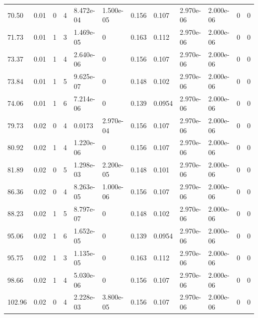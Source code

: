 \documentclass[preview]{standalone}
\begin{document}
{{\begin{tabular}{L{1.2cm}C{1.2cm} C{0.3cm}C{0.5cm} C{1.4cm}C{1.4cm} C{1.4cm}C{1.4cm} C{1.6cm}C{1.6cm} C{1.6cm}C{1.6cm}}
  70.50  &  0.01  & 0     &  4 &  8.472e-04  & 1.500e-05  &  0.156&   0.107& 2.970e-06 & 2.000e-06   &  0 & 0  \\ 
  71.73  &  0.01  & 1     &  3 &  1.469e-05  & 0  &  0.163&   0.112& 2.970e-06 & 2.000e-06   &  0 & 0  \\ 
  73.37  &  0.01  & 1     &  4 &  2.640e-06  & 0  &  0.156&   0.107& 2.970e-06 & 2.000e-06   &  0 & 0  \\ 
  73.84  &  0.01  & 1     &  5 &  9.625e-07  & 0  &  0.148&   0.102& 2.970e-06 & 2.000e-06   &  0 & 0  \\ 
  74.06  &  0.01  & 1     &  6 &  7.214e-06  & 0  &  0.139&   0.0954& 2.970e-06 & 2.000e-06   &  0 & 0  \\ 
  79.73  &  0.02  & 0     &  4 &  0.0173  & 2.970e-04  &  0.156&   0.107& 2.970e-06 & 2.000e-06   &  0 & 0  \\ 
  80.92  &  0.02  & 1     &  4 &  1.220e-06  & 0  &  0.156&   0.107& 2.970e-06 & 2.000e-06   &  0 & 0  \\ 
  81.89  &  0.02  & 0     &  5 &  1.298e-03  & 2.200e-05  &  0.148&   0.101& 2.970e-06 & 2.000e-06   &  0 & 0  \\ 
  86.36  &  0.02  & 0     &  4 &  8.263e-05  & 1.000e-06  &  0.156&   0.107& 2.970e-06 & 2.000e-06   &  0 & 0  \\ 
  88.23  &  0.02  & 1     &  5 &  8.797e-07  & 0  &  0.148&   0.102& 2.970e-06 & 2.000e-06   &  0 & 0  \\ 
  95.06  &  0.02  & 1     &  6 &  1.652e-05  & 0  &  0.139&   0.0954& 2.970e-06 & 2.000e-06   &  0 & 0  \\ 
  95.75  &  0.02  & 1     &  3 &  1.135e-05  & 0  &  0.163&   0.112& 2.970e-06 & 2.000e-06   &  0 & 0  \\ 
  98.66  &  0.02  & 1     &  4 &  5.030e-06  & 0  &  0.156&   0.107& 2.970e-06 & 2.000e-06   &  0 & 0  \\ 
  102.96  &  0.02  & 0     &  4 &  2.228e-03  & 3.800e-05  &  0.156&   0.107& 2.970e-06 & 2.000e-06   &  0 & 0  \\ 
\hline 
\end{tabular} 

}}
\end{document}
